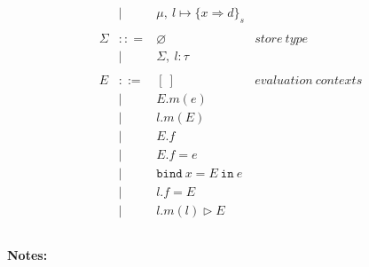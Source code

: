\documentclass{llncs}
\newcommand{\keywadj}[1]{\mathtt{#1}}
\newcommand{\keyw}[1]{\keywadj{#1}~}
\begin{document}
\[\begin{array}{lll}
\begin{array}{lllr}
& | & \mu,~l \mapsto \{ x \Rightarrow d \}_{s}\\
&&\\
\Sigma & :: = & \varnothing & store~type\\
& | & \Sigma,~l : \tau\\
&&\\
E & ::= & [~] & evaluation~ contexts\\
  & |   & E.m(e)\\
  & |   & l.m(E)\\
  & |   & E.f \\
  & |   & E.f = e \\
  & |   & \keyw{bind} x = E~\keyw{in} e \\
  & |   & l.f = E \\
  & |   & l.m(l) \rhd E \\
&&\\
\end{array}
\end{array}
\]

\noindent \textbf{Notes:}
\end{document}
